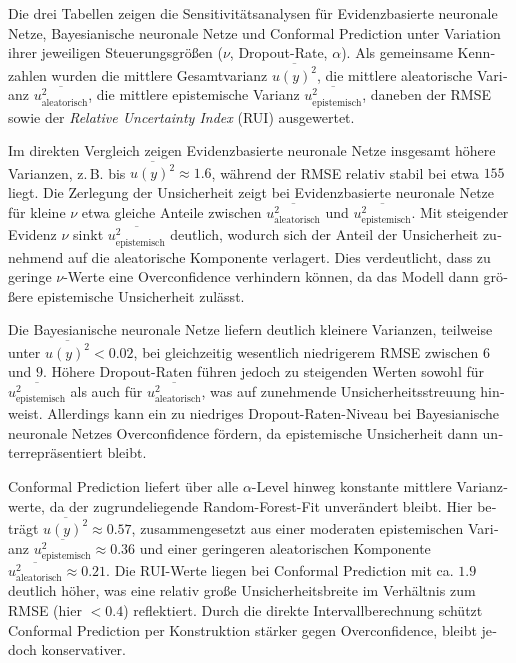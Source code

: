 \begin{otherlanguage}{ngerman}
Die drei Tabellen zeigen die Sensitivitätsanalysen für \gls{Evidenzbasierte neuronale Netze}, \gls{Bayesianische neuronale Netze} und \gls{Conformal Prediction} unter Variation ihrer jeweiligen Steuerungsgrößen (\(\nu\), Dropout-Rate, \(\alpha\)). Als gemeinsame Kennzahlen wurden die mittlere Gesamtvarianz \(\overline{u(y)^2}\), die mittlere aleatorische Varianz \(\overline{u_{\text{aleatorisch}}^2}\), die mittlere epistemische Varianz \(\overline{u_{\text{epistemisch}}^2}\), daneben der RMSE sowie der \emph{Relative Uncertainty Index} (RUI) ausgewertet.  

Im direkten Vergleich zeigen \gls{Evidenzbasierte neuronale Netze} insgesamt höhere Varianzen, z.\,B. bis \(\overline{u(y)^2} \approx 1.6\), während der RMSE relativ stabil bei etwa \(155\) liegt. Die Zerlegung der Unsicherheit zeigt bei \gls{Evidenzbasierte neuronale Netze} für kleine \(\nu\) etwa gleiche Anteile zwischen \(\overline{u_{\text{aleatorisch}}^2}\) und \(\overline{u_{\text{epistemisch}}^2}\). Mit steigender Evidenz \(\nu\) sinkt \(\overline{u_{\text{epistemisch}}^2}\) deutlich, wodurch sich der Anteil der Unsicherheit zunehmend auf die aleatorische Komponente verlagert. Dies verdeutlicht, dass zu geringe \(\nu\)-Werte eine Overconfidence verhindern können, da das Modell dann größere epistemische Unsicherheit zulässt.  

Die \gls{Bayesianische neuronale Netze} liefern deutlich kleinere Varianzen, teilweise unter \(\overline{u(y)^2} < 0.02\), bei gleichzeitig wesentlich niedrigerem RMSE zwischen \(6\) und \(9\). Höhere Dropout-Raten führen jedoch zu steigenden Werten sowohl für \(\overline{u_{\text{epistemisch}}^2}\) als auch für \(\overline{u_{\text{aleatorisch}}^2}\), was auf zunehmende Unsicherheitsstreuung hinweist. Allerdings kann ein zu niedriges Dropout-Raten-Niveau bei \gls{Bayesianische neuronale Netze}s Overconfidence fördern, da epistemische Unsicherheit dann unterrepräsentiert bleibt.  

\gls{Conformal Prediction} liefert über alle \(\alpha\)-Level hinweg konstante mittlere Varianzwerte, da der zugrundeliegende Random-Forest-Fit unverändert bleibt. Hier beträgt \(\overline{u(y)^2} \approx 0.57\), zusammengesetzt aus einer moderaten epistemischen Varianz \(\overline{u_{\text{epistemisch}}^2} \approx 0.36\) und einer geringeren aleatorischen Komponente \(\overline{u_{\text{aleatorisch}}^2} \approx 0.21\). Die RUI-Werte liegen bei \gls{Conformal Prediction} mit ca. \(1.9\) deutlich höher, was eine relativ große Unsicherheitsbreite im Verhältnis zum RMSE (hier \(< 0.4\)) reflektiert. Durch die direkte Intervallberechnung schützt \gls{Conformal Prediction} per Konstruktion stärker gegen Overconfidence, bleibt jedoch konservativer.  


\end{otherlanguage}
